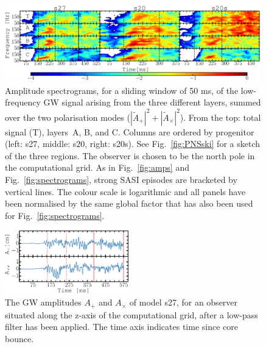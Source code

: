 \begin{figure}
\includegraphics[width=0.99\textwidth]{./images/chp1/fig11.pdf}
\caption{Amplitude spectrograms, for a sliding window of 50 ms, of the low-frequency GW signal arising from the three different layers,
  summed over the two polarisation modes ($|\widetilde{A}_+|^2 + |\widetilde{A}_\times|^2$). 
  From the top: total signal (T), layers~A, B, and C. Columns
  are ordered by progenitor (left: s27, middle: s20, right: s20s). 
  See Fig.~\ref{fig:PNSski} for a sketch of the three
  regions. The observer is chosen to be the north pole in the computational grid.
  As in Fig.~\ref{fig:amps} and Fig.~\ref{fig:spectrograms}, strong SASI episodes are bracketed by vertical lines. 
  The colour scale is logarithmic and all panels have been normalised by the same global factor that has also been used for Fig.~\ref{fig:spectrograms}.
\label{fig:lowspec}
}
\end{figure}

\begin{figure}
\includegraphics[width=0.48\textwidth]{./images/chp1/fig12.pdf}
\caption{The GW amplitudes $A_+$ and $A_{\times}$ of model s27, for an observer situated along the z-axis of the computational grid,
after a low-pass filter has been applied. The time axis indicates time since core bounce.
\label{fig:lowpass}}
\end{figure}

